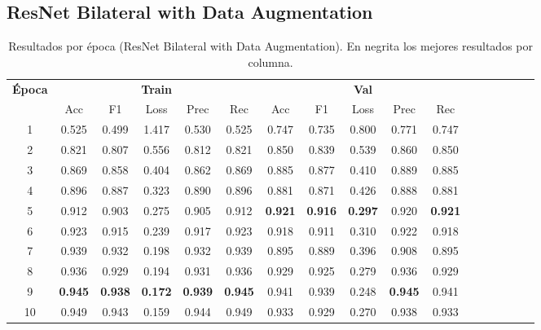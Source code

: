 \documentclass[conference]{IEEEtran}
\begin{document}
\subsection{ResNet Bilateral with Data Augmentation}
\begin{table}[h]
\scriptsize
\caption{Resultados por época (ResNet Bilateral with Data Augmentation). En negrita los mejores resultados por columna.}
\centering
\begin{tabular}{|c|c|c|c|c|c|c|c|c|c|c|c|c|c|c|c|c|}
\hline
\textbf{Época} & \multicolumn{5}{c|}{\textbf{Train}} & \multicolumn{5}{c|}{\textbf{Val}} \\
\cline{2-11}
 & Acc & F1 & Loss & Prec & Rec & Acc & F1 & Loss & Prec & Rec \\
\hline
1 & 0.525 & 0.499 & 1.417 & 0.530 & 0.525 & 0.747 & 0.735 & 0.800 & 0.771 & 0.747 \\
2 & 0.821 & 0.807 & 0.556 & 0.812 & 0.821 & 0.850 & 0.839 & 0.539 & 0.860 & 0.850 \\
3 & 0.869 & 0.858 & 0.404 & 0.862 & 0.869 & 0.885 & 0.877 & 0.410 & 0.889 & 0.885 \\
4 & 0.896 & 0.887 & 0.323 & 0.890 & 0.896 & 0.881 & 0.871 & 0.426 & 0.888 & 0.881 \\
5 & 0.912 & 0.903 & 0.275 & 0.905 & 0.912 & \textbf{0.921} & \textbf{0.916} & \textbf{0.297} & 0.920 & \textbf{0.921} \\
6 & 0.923 & 0.915 & 0.239 & 0.917 & 0.923 & 0.918 & 0.911 & 0.310 & 0.922 & 0.918 \\
7 & 0.939 & 0.932 & 0.198 & 0.932 & 0.939 & 0.895 & 0.889 & 0.396 & 0.908 & 0.895 \\
8 & 0.936 & 0.929 & 0.194 & 0.931 & 0.936 & 0.929 & 0.925 & 0.279 & 0.936 & 0.929 \\
9 & \textbf{0.945} & \textbf{0.938} & \textbf{0.172} & \textbf{0.939} & \textbf{0.945} & 0.941 & 0.939 & 0.248 & \textbf{0.945} & 0.941 \\
10 & 0.949 & 0.943 & 0.159 & 0.944 & 0.949 & 0.933 & 0.929 & 0.270 & 0.938 & 0.933 \\
\hline
\end{tabular}
\label{tab:resnet_bilateral_aug}
\end{table}
\end{document}
